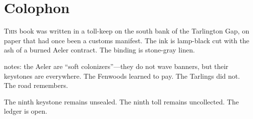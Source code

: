\documentclass[11pt,a5paper]{book}
\begin{document}
\clearpage

\chapter*{Colophon}

\lettrine{T}{his} book was written in a toll-keep on the south bank of the Tarlington Gap, on paper that had once been a customs manifest. The ink is lamp-black cut with the ash of a burned Aeler contract. The binding is stone-gray linen.

\gray{} notes: the Aeler are ``soft colonizers''---they do not wave banners, but their keystones are everywhere. The Fenwoods learned to pay. The Tarlings did not. The road remembers.

\vspace{1em}
\noindent The ninth keystone remains unsealed. The ninth toll remains uncollected. The ledger is open.
\end{document}
